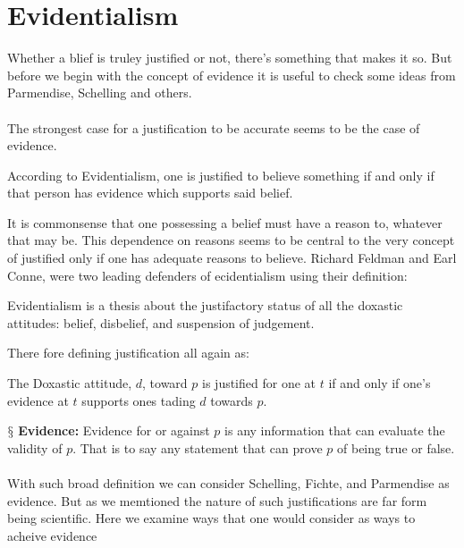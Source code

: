 \documentclass[10pt,a4paper]{article}
\newcommand{\newpoint}[1]{\indent$\mathsection$ \textbf{#1}}
\begin{document}
            \section{Evidentialism} 
                Whether a blief is truley justified or not, there's something that makes it so. But before we begin with the concept of evidence it is useful to check some ideas from Parmendise, Schelling and others.\cite{sep-epistemology}
                \\
                \\
                The strongest case for a justification to be accurate seems to be the case of evidence.
                \begin{define}
                    According to Evidentialism, one is justified to believe something if and only if that person has evidence which supports said belief. \cite{enwiki:1149588226}
                \end{define}
                It is commonsense that one possessing a belief must have a reason to, whatever that may be. This dependence on reasons seems to be central to the very concept of justified only if one has adequate reasons to believe. Richard Feldman and Earl Conne, were two leading defenders of ecidentialism using their definition:
                \begin{define}
                    Evidentialism is a thesis about the justifactory status of all the doxastic attitudes: belief, disbelief, and suspension of judgement.
                \end{define}
                There fore defining justification all again as:
                \begin{define}
                    The Doxastic attitude, $d$, toward $p$ is justified for one at $t$ if and only if one's evidence at $t$ supports ones tading $d$ towards $p$.
                \end{define}
                \newpoint{Evidence:} Evidence for or against $p$ is any information that can evaluate the validity of $p$. That is to say any statement that can prove $p$ of being true or false.\cite{Mittag2015-qc}
                \\
                \\
                With such broad definition we can consider Schelling, Fichte, and Parmendise as evidence. But as we memtioned the nature of such justifications are far form being scientific. Here we examine ways that one would consider as ways  to acheive evidence
                \\
                \\
\end{document}
